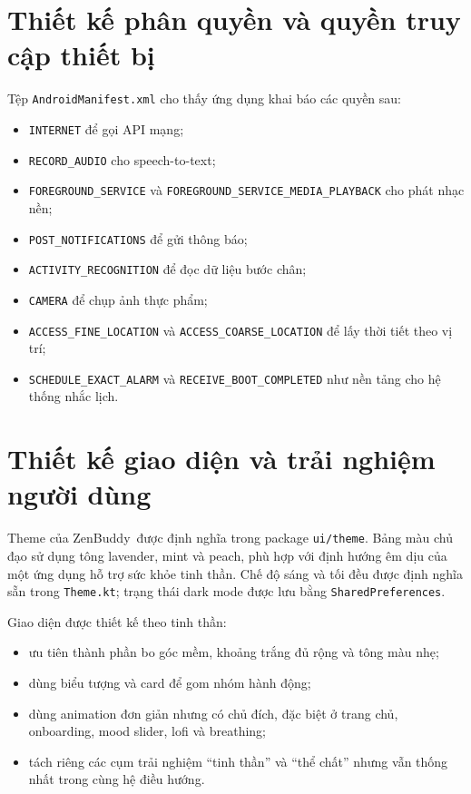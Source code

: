 \documentclass{zenbuddy-report}
\newcommand{\appname}{ZenBuddy}
\begin{document}
\section{Thiết kế phân quyền và quyền truy cập thiết bị}
Tệp \texttt{AndroidManifest.xml} cho thấy ứng dụng khai báo các quyền sau:
\begin{itemize}
  \item \texttt{INTERNET} để gọi API mạng;
  \item \texttt{RECORD\_AUDIO} cho speech-to-text;
  \item \texttt{FOREGROUND\_SERVICE} và \texttt{FOREGROUND\_SERVICE\_MEDIA\_PLAYBACK} cho phát nhạc nền;
  \item \texttt{POST\_NOTIFICATIONS} để gửi thông báo;
  \item \texttt{ACTIVITY\_RECOGNITION} để đọc dữ liệu bước chân;
  \item \texttt{CAMERA} để chụp ảnh thực phẩm;
  \item \texttt{ACCESS\_FINE\_LOCATION} và \texttt{ACCESS\_COARSE\_LOCATION} để lấy thời tiết theo vị trí;
  \item \texttt{SCHEDULE\_EXACT\_ALARM} và \texttt{RECEIVE\_BOOT\_COMPLETED} như nền tảng cho hệ thống nhắc lịch.
\end{itemize}

\section{Thiết kế giao diện và trải nghiệm người dùng}
Theme của \appname\ được định nghĩa trong package \texttt{ui/theme}. Bảng màu chủ đạo sử dụng tông lavender, mint và peach, phù hợp với định hướng êm dịu của một ứng dụng hỗ trợ sức khỏe tinh thần. Chế độ sáng và tối đều được định nghĩa sẵn trong \texttt{Theme.kt}; trạng thái dark mode được lưu bằng \texttt{SharedPreferences}.

Giao diện được thiết kế theo tinh thần:
\begin{itemize}
  \item ưu tiên thành phần bo góc mềm, khoảng trắng đủ rộng và tông màu nhẹ;
  \item dùng biểu tượng và card để gom nhóm hành động;
  \item dùng animation đơn giản nhưng có chủ đích, đặc biệt ở trang chủ, onboarding, mood slider, lofi và breathing;
  \item tách riêng các cụm trải nghiệm ``tinh thần'' và ``thể chất'' nhưng vẫn thống nhất trong cùng hệ điều hướng.
\end{itemize}
\end{document}
